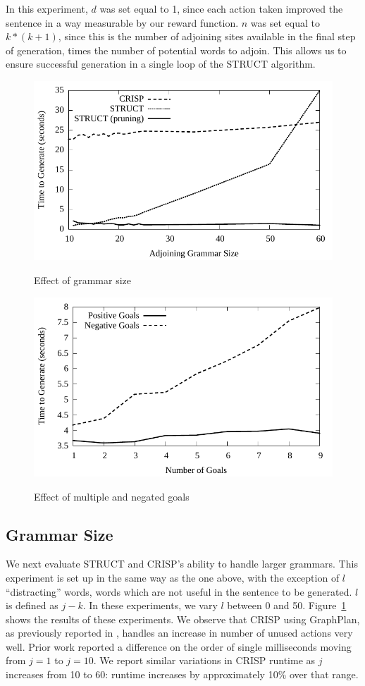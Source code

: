 In this experiment, $d$ was set equal to 1, since each action taken improved the sentence in
a way measurable by our reward function.  $n$ was set equal to $k * (k + 1)$, since this is
the number of adjoining sites available in the final step of generation, times the number
of potential words to adjoin.  This allows us to ensure successful generation in a single
loop of the STRUCT algorithm.

\begin{figure}
\centering
\includegraphics[width=0.7 \linewidth]{../analysis/plots/large-grammar/large-grammar.pdf}
\label{graph-large-grammars}
\caption{Effect of grammar size}
\end{figure}

\begin{figure}
\centering
\includegraphics[width=0.7 \linewidth]{../analysis/plots/goals/differentgoals.pdf}
\label{chart-different-goals}
\caption{Effect of multiple and negated goals}
\end{figure}

\subsection{Grammar Size}
We next evaluate STRUCT and CRISP's ability to
handle larger grammars. This experiment is set up in the same way as
the one above, with the exception of $l$ ``distracting'' words, words
which are not useful in the sentence to be generated.  $l$ is defined
as $j - k$.  In these experiments, we vary $l$ between 0 and 50.
Figure~\ref{graph-large-grammars} shows the results of these
experiments.  We observe that CRISP using GraphPlan, as previously
reported in \cite{koller_experiences_2011}, handles an increase in
number of unused actions very well.  Prior work reported a difference
on the order of single milliseconds moving from $j = 1$ to $j = 10$.
We report similar variations in CRISP runtime as $j$ increases from 10
to 60: runtime increases by approximately 10\% over that range.

